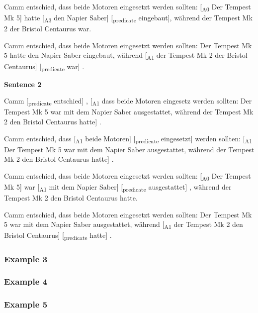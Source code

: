 \begin{landscape}
Camm entschied, dass beide Motoren eingesetzt werden sollten: [\textsubscript{A0} Der Tempest
Mk 5] hatte [\textsubscript{A3} den Napier Saber] [\textsubscript{predicate} eingebaut],
während der Tempest Mk 2 der Bristol Centaurus war.

Camm entschied, dass beide Motoren eingesetzt werden sollten: Der Tempest Mk 5 hatte den
Napier Saber eingebaut, während [\textsubscript{A1} der Tempest Mk 2 der Bristol Centaurus]
[\textsubscript{predicate} war] .

\textbf{Sentence 2}

Camm [\textsubscript{predicate} entschied] , [\textsubscript{A1} dass beide Motoren eingesetz
werden sollten: Der Tempest Mk 5 war mit dem Napier Saber ausgestattet, während der Tempest
Mk 2 den Bristol Centaurus hatte] .

Camm entschied, dass [\textsubscript{A1} beide Motoren] [\textsubscript{predicate} eingesetzt]
werden sollten: [\textsubscript{A1} Der Tempest Mk 5 war mit dem Napier Saber ausgestattet,
während der Tempest Mk 2 den Bristol Centaurus hatte] .

Camm entschied, dass beide Motoren eingesetzt werden sollten: [\textsubscript{A0} Der Tempest
Mk 5] war [\textsubscript{A1} mit dem Napier Saber] [\textsubscript{predicate} ausgestattet]
, während der Tempest Mk 2 den Bristol Centaurus hatte.

Camm entschied, dass beide Motoren eingesetzt werden sollten: Der Tempest Mk 5 war mit dem
Napier Saber ausgestattet, während [\textsubscript{A1} der Tempest Mk 2 den Bristol Centaurus]
[\textsubscript{predicate} hatte] .


\end{landscape}

\subsubsection{Example 3}


\subsubsection{Example 4}


\subsubsection{Example 5}

